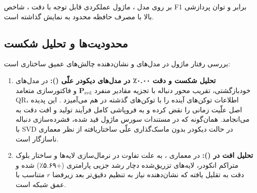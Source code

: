 بر روی مدل ، ماژول عملکردی قابل توجه با دقت ، شاخص F1 برابر  و توان پردازشی بالا  با مصرف حافظه محدود  به نمایش گذاشته است.

\subsection{محدودیت‌ها و تحلیل شکست}
بررسی رفتار ماژول در مدل‌های  و  نشان‌دهنده چالش‌های عمیق ساختاری است:
\begin{enumerate}
    \item \textbf{تحلیل شکست و دقت ۰.۰۰٪ در مدل‌های دیکودر علّی ():} در مدل‌های خودبازگشتی، تقریب محور دنباله با تجزیه مقادیر منفرد $\mathbf{P}_{\text{svd}}$ و فاکتورسازی متعامد QR، اطلاعات توکن‌های آینده را با توکن‌های گذشته در هم می‌آمیزد . این پدیده اصل علّیت زمانی  را نقض کرده و به فروپاشی کامل فرآیند تولید و افت دقت به  می‌انجامد. همان‌گونه که در مستندات سورس ماژول قید شده، فشرده‌سازی دنباله با SVD در حالت دیکودر بدون ماسک‌گذاری علّی ساختاریافته از نظر معماری ناسازگار است.
    \item \textbf{تحلیل افت در  ():} در معماری ، به علت تفاوت در نرمال‌سازی لایه‌ها و ساختار بلوک متراکم انکودر، لایه‌های تزریق‌شده دچار رشد جزیی پارامتری (+۵.۶۹٪) شده و دقت به  تقلیل یافته که نشان‌دهنده نیاز به تنظیم دقیق‌تر بعد زیرفضا $r$ متناسب با عمق شبکه است.
\end{enumerate}
